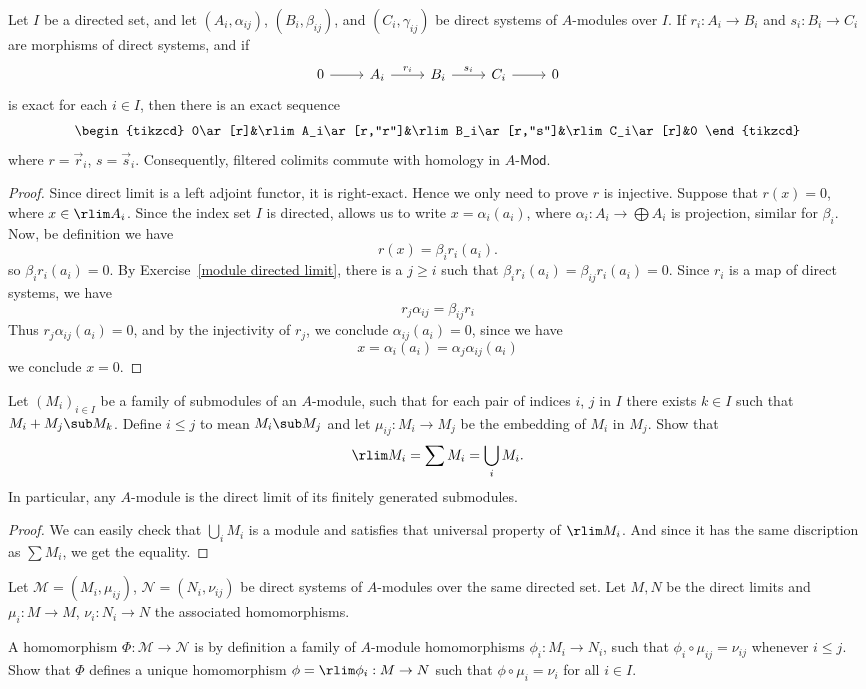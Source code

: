 \begin{exercise}\label{module directed limit exactness}
Let $I$ be a directed set, and let $(A_i,\alpha_{ij})$, $(B_i,\beta_{ij})$, and $(C_i,\gamma_{ij})$ be direct systems of $A$-modules over $I$. If $r_i:A_i\to B_i$ and $s_i:B_i\to C_i$ are morphisms of direct systems, and if
\[\begin{tikzcd}
0\ar[r]&A_i\ar[r,"r_i"]&B_i\ar[r,"s_i"]&C_i\ar[r]&0
\end{tikzcd}\]
is exact for each $i\in I$, then there is an exact sequence
\[\begin{tikzcd}
0\ar[r]&\rlim A_i\ar[r,"r"]&\rlim B_i\ar[r,"s"]&\rlim C_i\ar[r]&0
\end{tikzcd}\]
where $r=\vec{r}_i$, $s=\vec{s}_i$. Consequently, filtered colimits commute with homology in $A$-$\mathsf{Mod}$.
\end{exercise}
\begin{proof}
Since direct limit is a left adjoint functor, it is right-exact. Hence we only need to prove $r$ is injective. Suppose that $r(x)=0$, where $x\in\rlim A_i$. Since the index set $I$ is
directed, allows us to write $x=\alpha_i(a_i)$, where $\alpha_i:A_i\to\bigoplus A_i$ is projection, similar for $\beta_i$. Now, be definition we have
\[r(x)=\beta_ir_i(a_i).\]
so $\beta_ir_i(a_i)=0$. By Exercise~\ref{module directed limit}, there is a $j\geq i$ such that $\beta_ir_i(a_i)=\beta_{ij}r_i(a_i)=0$. Since $r_i$ is a map of direct systems, we have
\[r_j\alpha_{ij}=\beta_{ij}r_i\]
Thus $r_j\alpha_{ij}(a_i)=0$, and by the injectivity of $r_j$, we conclude $\alpha_{ij}(a_i)=0$, since we have
\[x=\alpha_i(a_i)=\alpha_j\alpha_{ij}(a_i)\]
we conclude $x=0$. 
\end{proof}
\begin{exercise}
Let $(M_i)_{i\in I}$ be a family of submodules of an $A$-module, such that for each pair of indices $i$, $j$ in $I$ there exists $k\in I$ such that $M_i+M_j\sub M_k$. Define $i\leq j$ to mean $M_i\sub M_j$ and let $\mu_{ij}:M_i\to M_j$ be the embedding of $M_i$ in $M_j$. Show that
\[\rlim M_i=\sum M_i=\bigcup_iM_i.\]
In particular, any $A$-module is the direct limit of its finitely generated submodules.
\end{exercise}
\begin{proof}
We can easily check that $\bigcup_iM_i$ is a module and satisfies that universal property of $\rlim M_i$. And since it has the same discription as $\sum M_i$, we get the equality.
\end{proof}
\begin{exercise}
Let $\mathcal{M}=(M_i,\mu_{ij})$, $\mathcal{N}=(N_i,\nu_{ij})$ be direct systems of $A$-modules over the same directed set. Let $M,N$ be the direct limits and $\mu_i:M\to M$, $\nu_i:N_i\to N$ the associated homomorphisms.\par
A homomorphism $\Phi:\mathcal{M}\to\mathcal{N}$ is by definition a family of $A$-module homomorphisms $\phi_i:M_i\to N_i$, such that $\phi_i\circ\mu_{ij}=\nu_{ij}$ whenever $i\leq j$. Show that $\Phi$ defines a unique homomorphism $\phi=\rlim\phi_i:M\to N$ such that $\phi\circ\mu_i=\nu_i$ for all $i\in I$.
\end{exercise}
